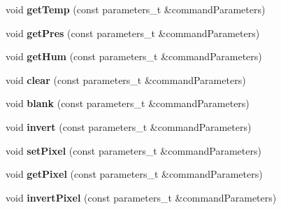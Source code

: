 \begin{DoxyCompactItemize}
\item 
void {\bfseries get\+Temp} (const parameters\+\_\+t \&command\+Parameters)\hypertarget{class_m_q_t_tsense_h_a_t_a39ff54904e181f55b4242c800e60a95f}{}\label{class_m_q_t_tsense_h_a_t_a39ff54904e181f55b4242c800e60a95f}

\item 
void {\bfseries get\+Pres} (const parameters\+\_\+t \&command\+Parameters)\hypertarget{class_m_q_t_tsense_h_a_t_a30a58adadcb37aeccd992ca9458e17e1}{}\label{class_m_q_t_tsense_h_a_t_a30a58adadcb37aeccd992ca9458e17e1}

\item 
void {\bfseries get\+Hum} (const parameters\+\_\+t \&command\+Parameters)\hypertarget{class_m_q_t_tsense_h_a_t_ad61c2741b9e195b607bb8fe6ac9a3832}{}\label{class_m_q_t_tsense_h_a_t_ad61c2741b9e195b607bb8fe6ac9a3832}

\item 
void {\bfseries clear} (const parameters\+\_\+t \&command\+Parameters)\hypertarget{class_m_q_t_tsense_h_a_t_af05cb64126bd0591d5ca4bac5b48b111}{}\label{class_m_q_t_tsense_h_a_t_af05cb64126bd0591d5ca4bac5b48b111}

\item 
void {\bfseries blank} (const parameters\+\_\+t \&command\+Parameters)\hypertarget{class_m_q_t_tsense_h_a_t_a7736e041ad475ec82756223c90da547e}{}\label{class_m_q_t_tsense_h_a_t_a7736e041ad475ec82756223c90da547e}

\item 
void {\bfseries invert} (const parameters\+\_\+t \&command\+Parameters)\hypertarget{class_m_q_t_tsense_h_a_t_aac0a786db57adb1f70f4932bc3800cff}{}\label{class_m_q_t_tsense_h_a_t_aac0a786db57adb1f70f4932bc3800cff}

\item 
void {\bfseries set\+Pixel} (const parameters\+\_\+t \&command\+Parameters)\hypertarget{class_m_q_t_tsense_h_a_t_a2c2134187487882f89a850b6a7f010ec}{}\label{class_m_q_t_tsense_h_a_t_a2c2134187487882f89a850b6a7f010ec}

\item 
void {\bfseries get\+Pixel} (const parameters\+\_\+t \&command\+Parameters)\hypertarget{class_m_q_t_tsense_h_a_t_aac431239ec91b0c7647fc90f2780d5e3}{}\label{class_m_q_t_tsense_h_a_t_aac431239ec91b0c7647fc90f2780d5e3}

\item 
void {\bfseries invert\+Pixel} (const parameters\+\_\+t \&command\+Parameters)\hypertarget{class_m_q_t_tsense_h_a_t_ae5172290839c6af0821f41bae9cf30c7}{}\label{class_m_q_t_tsense_h_a_t_ae5172290839c6af0821f41bae9cf30c7}


\end{DoxyCompactItemize}
